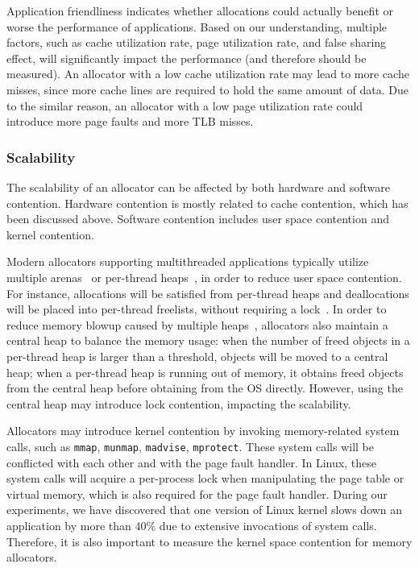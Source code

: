 Application friendliness indicates whether allocations could actually benefit or worse the performance of applications. Based on our understanding, multiple factors, such as cache utilization rate, page utilization rate, and false sharing effect, will significantly impact the performance (and therefore should be measured). An allocator with a low cache utilization rate may lead to more cache misses, since more cache lines are required to hold the same amount of data. Due to the similar reason, an allocator with a low page utilization rate could introduce more page faults and more TLB misses. 

\subsubsection{Scalability} 
\label{sec:scalability}

The scalability of an allocator can be affected by both hardware and software contention. Hardware contention is mostly related to cache contention, which has been discussed above. Software contention includes user space contention and kernel contention. 

Modern allocators supporting multithreaded applications typically utilize multiple arenas~\cite{dlmalloc} or per-thread heaps~\cite{Hoard}, in order to reduce user space contention. For instance, allocations will be satisfied from per-thread heaps and deallocations will be placed into per-thread freelists, without requiring a lock~\cite{TcMalloc, jemalloc}. In order to reduce memory blowup caused by multiple heaps~\cite{Hoard}, allocators also maintain a central heap to balance the memory usage: when the number of freed objects in a per-thread heap is larger than a threshold, objects will be moved to a central heap; when a per-thread heap is running out of memory, it obtains freed objects from the central heap before obtaining from the OS directly. However, using the central heap may introduce lock contention, impacting the scalability.  

 
 Allocators may introduce kernel contention by invoking memory-related system calls, such as \texttt{mmap}, \texttt{munmap}, \texttt{madvise}, \texttt{mprotect}. These system calls will be  conflicted with each other and with the page fault handler.  In Linux, these system calls will acquire a per-process lock when manipulating the page table or virtual memory, which is also required for the page fault handler. During our experiments, we have discovered that one version of Linux kernel slows down an application by more than 40\% due to extensive invocations of system calls. Therefore, it is also important to measure the kernel space contention for memory allocators.
 

